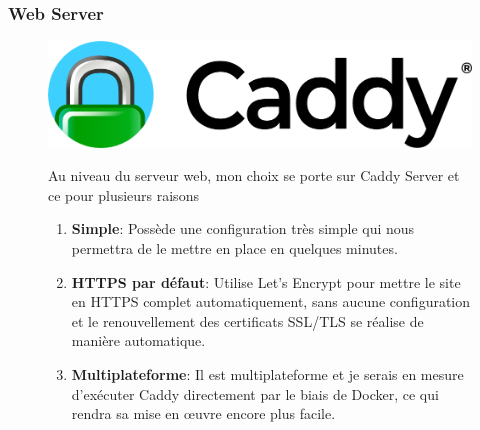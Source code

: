 \subsubsection{Web Server}

\begin{figure}[H]
  \begin{minipage}{.3\textwidth}
    \includegraphics[width=0.75\linewidth]{img/caddy.png} 
  \end{minipage} 
  \begin{minipage}{.7\textwidth}
    Au niveau du serveur web, mon choix se porte sur Caddy Server et ce pour plusieurs raisons
    \begin{enumerate}
      \item \textbf{Simple}: Possède une configuration très simple qui nous permettra de le mettre en place en quelques minutes.
      \item \textbf{HTTPS par défaut}: Utilise Let's Encrypt pour mettre le site en HTTPS complet automatiquement, sans aucune configuration et le renouvellement des certificats SSL/TLS se réalise de manière automatique.
      \item \textbf{Multiplateforme}: Il est multiplateforme et je serais en mesure d'exécuter Caddy directement par le biais de Docker, ce qui rendra sa mise en œuvre encore plus facile.
    \end{enumerate}
  \end{minipage} 
\end{figure}

